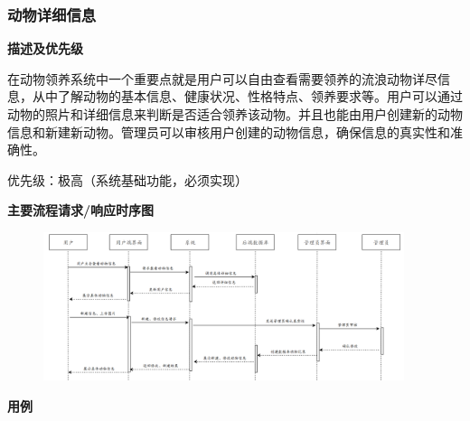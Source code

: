 \documentclass[12pt,a4paper,UTF8]{article}
\begin{document}
\subsubsection{动物详细信息}

\noindent\textbf{描述及优先级}

在动物领养系统中一个重要点就是用户可以自由查看需要领养的流浪动物详尽信息，从中了解动物的基本信息、健康状况、性格特点、领养要求等。用户可以通过动物的照片和详细信息来判断是否适合领养该动物。并且也能由用户创建新的动物信息和新建新动物。管理员可以审核用户创建的动物信息，确保信息的真实性和准确性。

优先级：极高（系统基础功能，必须实现）

\noindent\textbf{主要流程请求/响应时序图}

\begin{figure}[H]
  \centering
  \includegraphics[width=0.94\textwidth]{figures/use324.png}
\end{figure}

\noindent\textbf{用例}
\end{document}
